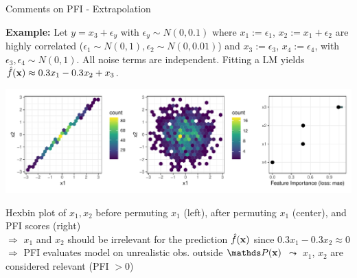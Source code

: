 \documentclass[11pt,compress,t,notes=noshow, aspectratio=169, xcolor=table]{beamer}
\begin{document}
\begin{frame}{Comments on PFI - Extrapolation}
 
 
 \textbf{Example:} Let $y = x_3 + \epsilon_y$ with $\epsilon_y \sim N(0, 0.1)$ where $x_1 :=  \epsilon_1$, $x_2 := x_1 + \epsilon_2$ are highly correlated ($\epsilon_1 \sim N(0,1), \epsilon_2 \sim N(0, 0.01)$) and $x_3 := \epsilon_3$, $x_4 := \epsilon_4$,  with $\epsilon_3, \epsilon_4 \sim N(0,1)$. All noise terms are independent.
 Fitting a LM yields $\fh(\xv) \approx 0.3 x_1 - 0.3 x_2 + x_3$.
\pause

\centerline{\includegraphics[width=0.9\linewidth]{figure_man/pfi_hexbin_extrapolation.pdf}}
Hexbin plot of $x_1, x_2$ before permuting $x_1$ (left), after permuting $x_1$ (center), and PFI scores (right)
\\
\pause
% 
$\Rightarrow$ $x_1$ and $x_2$ should be irrelevant for the prediction $\fh(\xv)$ %
since $0.3 x_1 - 0.3 x_2 \approx 0$ \\
$\Rightarrow$ PFI evaluates model on unrealistic obs. outside $\P(\xv)$ $\leadsto$ $x_1$, $x_2$ are considered relevant (PFI $> 0$)

\end{frame}
\end{document}
